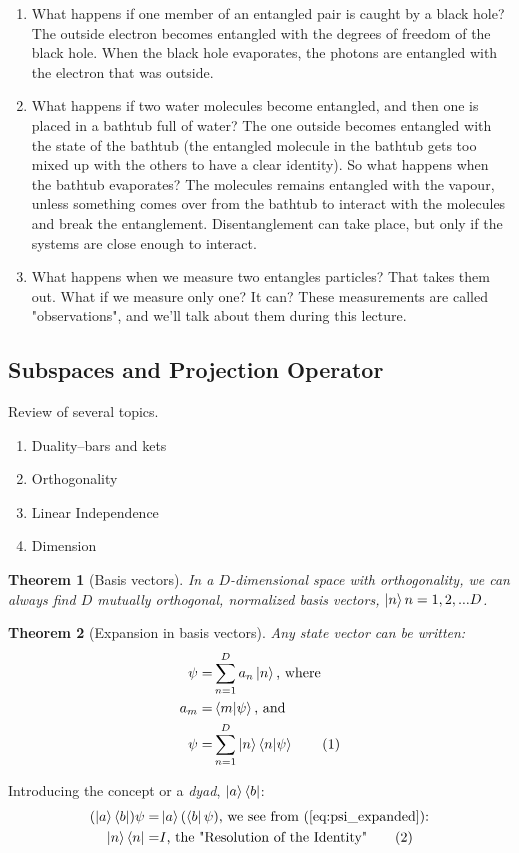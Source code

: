 \documentclass[]{article}
\newcommand\numberthis{\addtocounter{equation}{1}\tag{\theequation}}
\newtheorem{thm}{Theorem}
\begin{document}
\begin{enumerate}
	\item What happens if one member of an entangled pair is caught by a black hole? The outside electron becomes entangled with the degrees of freedom of the black hole. When the black hole evaporates, the photons are entangled with the electron that was outside.
	\item What happens if two water molecules become entangled, and then one is placed in a bathtub full of water? The one outside becomes entangled with the state of the bathtub (the entangled molecule in the bathtub gets too mixed up with the others to have a clear identity). So what happens when the bathtub evaporates? The molecules remains entangled with the vapour, unless something comes over from the bathtub to interact with the molecules and break the entanglement. Disentanglement can take place, but only if the systems are close enough to interact.
	\item What happens when we measure two entangles particles? That takes them out. What if we measure only one? It can? These measurements are called "observations", and we'll talk about them during this lecture.
\end{enumerate}

\subsection{Subspaces and Projection Operator}

Review of several topics.
\begin{enumerate}
	\item Duality--bars and kets
	\item Orthogonality
	\item Linear Independence
	\item Dimension
\end{enumerate}

\begin{thm}[Basis vectors]
	In a $D$-dimensional space with orthogonality, we can always find $D$ mutually orthogonal, normalized basis vectors, $\ket{n} n=1,2,...D$.
\end{thm}

\begin{thm}[Expansion in basis vectors]
	Any state vector can be written:
	\begin{align*}
		\psi =& \sum_{n=1}^{D} a_n \ket{n} \text{, where}\\
		a_m =& \braket{m\vert\psi} \text{, and}\\
		\psi =& \sum_{n=1}^{D} \ket{n} \braket{n\vert\psi} \numberthis \label{eq:psi_expanded}
	\end{align*}
\end{thm}
Introducing the concept or a \emph{dyad}, $\ket{a}\bra{b}$:
\begin{align*}
	(\ket{a}\bra{b})\psi =& \ket{a}(\bra{b}\psi) \text{, we see from (\ref{eq:psi_expanded}):}\\
	\ket{n}\bra{n} =& I \text{, the "Resolution of the Identity"} \numberthis \label{eq:resolution:identity}
\end{align*}
\end{document}
